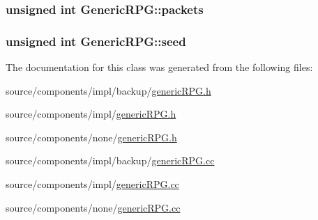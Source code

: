 \hypertarget{classGenericRPG_f0b3d6cc42470254870cd9a919056b05}{
\subsubsection[{packets}]{\setlength{\rightskip}{0pt plus 5cm}unsigned int {\bf GenericRPG::packets}}}
\label{classGenericRPG_f0b3d6cc42470254870cd9a919056b05}


\hypertarget{classGenericRPG_6a09dde0d73a3d1d89187dc7f0dccc8b}{
\subsubsection[{seed}]{\setlength{\rightskip}{0pt plus 5cm}unsigned int {\bf GenericRPG::seed}}}
\label{classGenericRPG_6a09dde0d73a3d1d89187dc7f0dccc8b}




The documentation for this class was generated from the following files:\begin{CompactItemize}
\item 
source/components/impl/backup/\hyperlink{impl_2backup_2genericRPG_8h}{genericRPG.h}\item 
source/components/impl/\hyperlink{impl_2genericRPG_8h}{genericRPG.h}\item 
source/components/none/\hyperlink{none_2genericRPG_8h}{genericRPG.h}\item 
source/components/impl/backup/\hyperlink{impl_2backup_2genericRPG_8cc}{genericRPG.cc}\item 
source/components/impl/\hyperlink{impl_2genericRPG_8cc}{genericRPG.cc}\item 
source/components/none/\hyperlink{none_2genericRPG_8cc}{genericRPG.cc}\end{CompactItemize}
